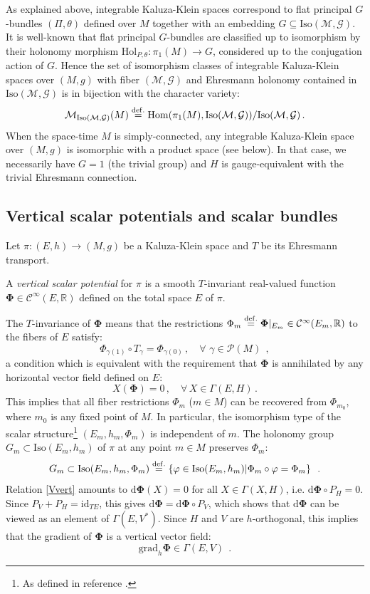\documentclass[10pt, cmp, numbook, final, a4paper]{svjour}
\newcommand*{\SavedEqref}{}
\let\SavedEqref\eqref
\renewcommand*{\eqref}[1]{%
  \begingroup
    \hypersetup{
      linkcolor=blue,
      linkbordercolor=blue,
    }%
    \SavedEqref{#1}%
  \endgroup
}
\newcommand{\Hom}{{\rm Hom}}
\newcommand{\eqdef}{\stackrel{{\rm def.}}{=}}
\def\R{\mathbb{R}}
\def\dd{\mathrm{d}}
\newcommand{\be}{\begin{equation*}}
\newcommand{\ee}{\end{equation*}}
\newcommand{\ben}{\begin{equation}}
\newcommand{\een}{\end{equation}}
\newcommand{\id}{\mathrm{id}}
\def\cC{{\mathcal C}}
\newcommand{\cM}{\mathcal{M}}
\def\Hol{\mathrm{Hol}}
\def\cP{\mathcal{P}}
\def\cG{\mathcal{G}}
\def\cC{\mathcal{C}}
\def\bPhi{\mathbf{\Phi}}
\def\grad{\mathrm{grad}}
\def\Iso{\mathrm{Iso}}
\begin{document}
As explained above, integrable Kaluza-Klein spaces correspond to flat
principal $G$-bundles $(\Pi,\theta)$ defined over $M$ together with an
embedding $G\subseteq \Iso(\cM,\cG)$. It is well-known that flat
principal $G$-bundles are classified up to isomorphism by their
holonomy morphism $\Hol_{P,\theta}:\pi_1(M)\rightarrow G$, considered
up to the conjugation action of $G$. Hence the set of isomorphism
classes of integrable Kaluza-Klein spaces over $(M,g)$ with
fiber $(\cM,\cG)$ and Ehresmann holonomy contained in 
$\Iso(\cM,\cG)$ is in bijection with the character variety:
\begin{equation*}
\cM_{\Iso(\cM,\cG)}(M)\eqdef \Hom(\pi_1(M),\Iso(\cM,\cG))/\Iso(\cM,\cG)\, .
\end{equation*}
When the space-time $M$ is simply-connected, any integrable
Kaluza-Klein space over $(M,g)$ is isomorphic with a product space
(see below). In that case, we necessarily have $G=1$ (the trivial
group) and $H$ is gauge-equivalent with the trivial Ehresmann
connection.

\subsection{Vertical scalar potentials and scalar bundles}

Let $\pi:(E,h)\rightarrow (M,g)$ be a Kaluza-Klein space and $T$ be
its Ehresmann transport.

\begin{definition}
A \emph{vertical scalar potential} for $\pi$ is a smooth $T$-invariant
real-valued function $\bPhi \in \cC^\infty(E,\R)$ defined on the total
space $E$ of $\pi$.
\end{definition}

\noindent 
The $T$-invariance of $\bPhi$ means that the restrictions
$\Phi_m\eqdef \bPhi|_{E_m}\in \cC^\infty(E_m,\R)$ to the fibers of $E$
satisfy:
\be
\Phi_{\gamma(1)}\circ T_\gamma=\Phi_{\gamma(0)}\, ,\quad \forall\,\, \gamma\in \cP(M)~~, 
\ee
a condition which is equivalent with the requirement that $\bPhi$ is
annihilated by any horizontal vector field defined on $E$:
\ben
\label{Vvert}
X(\bPhi)=0\, , \quad \forall\, X\in \Gamma(E,H)\, .
\een
This implies that all fiber restrictions $\Phi_m$ ($m\in M$) can be
recovered from $\Phi_{m_0}$, where $m_0$ is any fixed point of $M$. In
particular, the isomorphism type of the scalar structure\footnote{As
defined in reference \cite{GESM}.} $(E_m,h_m,\Phi_m)$ is independent
of $m$. The holonomy group $G_{m}\subset \Iso(E_{m},h_{m})$ of $\pi$
at any point $m\in M$ preserves $\Phi_{m}$:
\be
G_m \subset \Iso(E_m, h_m, \Phi_m)\eqdef \{\varphi\in \Iso(E_m,h_m)|\Phi_m\circ \varphi=\Phi_m\}~~.
\ee
Relation \eqref{Vvert} amounts to $\dd \bPhi (X)=0$ for all
$X\in\Gamma(X,H)$, i.e. $\dd \bPhi \circ P_H=0$. Since
$P_V+P_H=\id_{TE}$, this gives $\dd \bPhi=\dd \bPhi \circ P_V$, which
shows that $\dd \bPhi$ can be viewed as an element of
$\Gamma(E,V^\ast)$. Since $H$ and $V$ are $h$-orthogonal, this implies
that the gradient of $\bPhi$ is a vertical vector field:
\be
\grad_h \bPhi\in \Gamma(E,V)~~.
\ee
\end{document}
